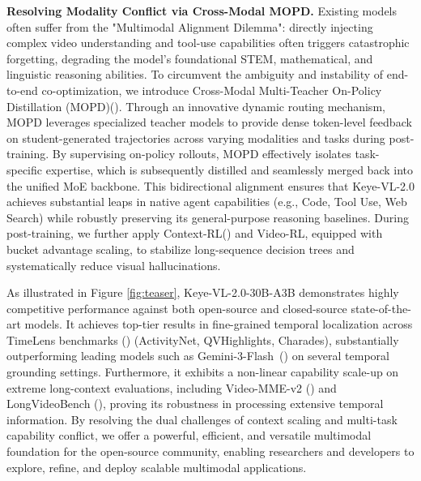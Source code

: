 \textbf{Resolving Modality Conflict via Cross-Modal MOPD.} Existing models often suffer from the "Multimodal Alignment Dilemma": directly injecting complex video understanding and tool-use capabilities often triggers catastrophic forgetting, degrading the model's foundational STEM, mathematical, and linguistic reasoning abilities. To circumvent the ambiguity and instability of end-to-end co-optimization, we introduce Cross-Modal Multi-Teacher On-Policy Distillation (MOPD)(\cite{mimoteam2026v2flash}). Through an innovative dynamic routing mechanism, MOPD leverages specialized teacher models to provide dense token-level feedback on student-generated trajectories across varying modalities and tasks during post-training. By supervising on-policy rollouts, MOPD effectively isolates task-specific expertise, which is subsequently distilled and seamlessly merged back into the unified MoE backbone. This bidirectional alignment ensures that Keye-VL-2.0 achieves substantial leaps in native agent capabilities (e.g., Code, Tool Use, Web Search) while robustly preserving its general-purpose reasoning baselines. During post-training, we further apply Context-RL(\cite{lu2026contextrl}) and Video-RL, equipped with bucket advantage scaling, to stabilize long-sequence decision trees and systematically reduce visual hallucinations.

As illustrated in Figure \ref{fig:teaser}, Keye-VL-2.0-30B-A3B demonstrates highly competitive performance against both open-source and closed-source state-of-the-art models. It achieves top-tier results in fine-grained temporal localization across TimeLens benchmarks (\cite{zhang2025timelens}) (ActivityNet, QVHighlights, Charades), substantially outperforming leading models such as Gemini-3-Flash~(\cite{deepmind2025gemini3flash}) on several temporal grounding settings. Furthermore, it exhibits a non-linear capability scale-up on extreme long-context evaluations, including Video-MME-v2 (\cite{fu2026videomme2}) and LongVideoBench (\cite{wu2024longvideobench}), proving its robustness in processing extensive temporal information. By resolving the dual challenges of context scaling and multi-task capability conflict, we offer a powerful, efficient, and versatile multimodal foundation for the open-source community, enabling researchers and developers to explore, refine, and deploy scalable multimodal applications.
